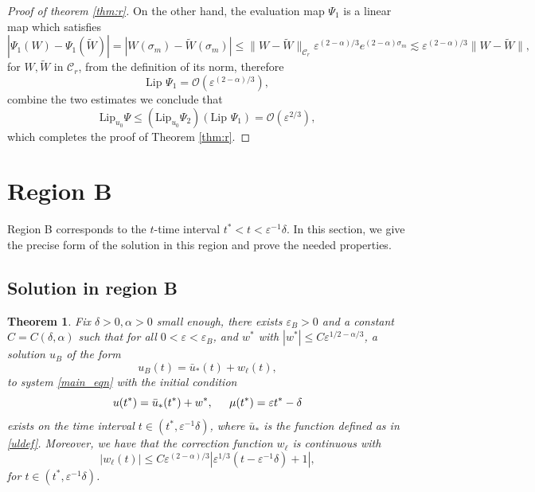 \documentclass[letterpaper,11pt]{article}
\newcommand{\rmO}{\mathcal{O}}
\newcommand{\eps}{\varepsilon}
\newcommand{\lar}{ \lesssim }
\numberwithin{equation}{section}
\theoremstyle{plain}
\newtheorem{theorem}{Theorem}[section]
\begin{document}
\begin{proof}[Proof of theorem \ref{thm:r}]
On the other hand, the evaluation map $\Psi_1$ is a linear map which satisfies
\[
|\Psi_1(W)-\Psi_1(\widetilde{W})| = |W(\sigma_m) -\widetilde{W}(\sigma_m) | \le\|W - \widetilde{W}\|_{\mathcal{C}_r}\eps^{(2-\alpha)/3} e^{(2-\alpha)\sigma_m} \lar \eps^{(2-\alpha)/3}\|W-\widetilde{W}\|,
\]
for $W,\widetilde{W}$ in $\mathcal{C}_r$, from the definition of its norm, therefore
\[
\text{Lip } \Psi_1 = \rmO(\eps^{(2-\alpha)/3}),
\]
combine the two estimates we conclude that 
\[
\text{Lip}_{u_0} \Psi \le \left( \text{Lip}_{u_0} \Psi_2 \right) \left( \text{Lip } \Psi_1 \right) = \rmO(\eps^{2/3}),
\] 
which completes the proof of Theorem \ref{thm:r}.
\end{proof}

\section{Region B}\label{sec_B}

Region B corresponds to the $t$-time interval $ t^*< t< \eps^{-1}\delta$. In this section, we give the precise form of the solution in this region and prove the needed properties.

\subsection{Solution in region B}

\begin{theorem}\label{thm:l}
Fix $\delta>0, \alpha>0$ small enough, there exists $\eps_B>0$ and a constant $C=C(\delta,\alpha)$ such that for all $0<\eps <\eps_B$, and $w^*$ with $|w^*| \le  C\eps^{1/2-\alpha/3}$, a solution $u_B$ of the form 
\begin{equation}
u_B(t) = \bar{u}_*(t) + w_\ell(t),
\end{equation}
to system \eqref{main_eqn} with the initial condition
\begin{equation}\label{ul_ic}
u(t^*) = \bar{u}_*(t^*) + w^*, \hspace{0.2in}\mu(t^*) = \eps t^* -\delta
\end{equation}
exists on the time interval $t \in (t^*, \eps^{-1}\delta)$, where $\bar{u}_*$ is the function defined as in \eqref{uldef}. Moreover, we have that the correction function $w_\ell$ is continuous with
\begin{equation}\label{thm:l_1}
|w_\ell(t)| \le C\eps^{(2-\alpha)/3} | \eps^{1/3}(t-\eps^{-1}\delta)+1|,
\end{equation}
for $t \in (t^*, \eps^{-1}\delta)$.
\end{theorem}
\end{document}
